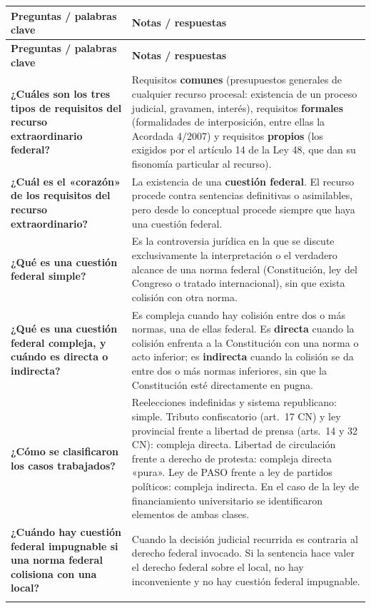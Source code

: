 \documentclass[12pt,oneside]{book}
\newlength{\cornellleft}
\newlength{\cornellright}
\newcommand{\cornellheader}{%
    \toprule
    \rowcolor{blue!8}
    \textbf{Preguntas / palabras clave} & \textbf{Notas / respuestas} \\
    \midrule
}
\newcommand{\cornellsep}{%
    \arrayrulecolor{gray!50}\midrule[0.3pt]\arrayrulecolor{black}%
}
\begin{document}
\begin{longtable}{
    >{\raggedright\arraybackslash}p{\cornellleft}
    >{\raggedright\arraybackslash}p{\cornellright}
}
\cornellheader
\endfirsthead
\cornellheader
\endhead

\textbf{¿Cuáles son los tres tipos de requisitos del recurso extraordinario federal?} &
Requisitos \textbf{comunes} (presupuestos generales de cualquier recurso procesal: existencia de un proceso judicial, gravamen, interés), requisitos \textbf{formales} (formalidades de interposición, entre ellas la Acordada 4/2007) y requisitos \textbf{propios} (los exigidos por el artículo 14 de la Ley 48, que dan su fisonomía particular al recurso). \\
\cornellsep

\textbf{¿Cuál es el «corazón» de los requisitos del recurso extraordinario?} &
La existencia de una \textbf{cuestión federal}. El recurso procede contra sentencias definitivas o asimilables, pero desde lo conceptual procede siempre que haya una cuestión federal. \\
\cornellsep

\textbf{¿Qué es una cuestión federal simple?} &
Es la controversia jurídica en la que se discute exclusivamente la interpretación o el verdadero alcance de una norma federal (Constitución, ley del Congreso o tratado internacional), sin que exista colisión con otra norma. \\
\cornellsep

\textbf{¿Qué es una cuestión federal compleja, y cuándo es directa o indirecta?} &
Es compleja cuando hay colisión entre dos o más normas, una de ellas federal. Es \textbf{directa} cuando la colisión enfrenta a la Constitución con una norma o acto inferior; es \textbf{indirecta} cuando la colisión se da entre dos o más normas inferiores, sin que la Constitución esté directamente en pugna. \\
\cornellsep

\textbf{¿Cómo se clasificaron los casos trabajados?} &
Reelecciones indefinidas y sistema republicano: simple. Tributo confiscatorio (art.~17 CN) y ley provincial frente a libertad de prensa (arts.~14 y 32 CN): compleja directa. Libertad de circulación frente a derecho de protesta: compleja directa «pura». Ley de PASO frente a ley de partidos políticos: compleja indirecta. En el caso de la ley de financiamiento universitario se identificaron elementos de ambas clases. \\
\cornellsep

\textbf{¿Cuándo hay cuestión federal impugnable si una norma federal colisiona con una local?} &
Cuando la decisión judicial recurrida es contraria al derecho federal invocado. Si la sentencia hace valer el derecho federal sobre el local, no hay inconveniente y no hay cuestión federal impugnable. \\
\cornellsep


\end{longtable}
\end{document}
